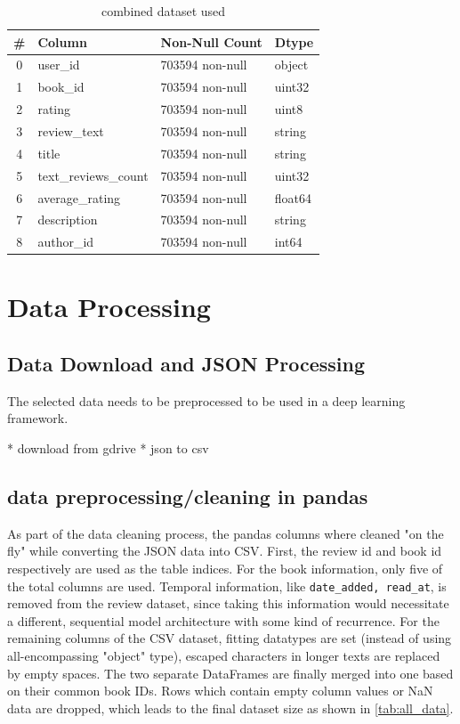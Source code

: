 \documentclass[10pt,final,journal,a4paper,oneside,twocolumn]{IEEEtran}
\begin{document}
\begin{table}[h]
\begin{center}
        \begin{tabular}{clll}
        \toprule
        \# & Column & Non-Null Count & Dtype \\
        \midrule
        0 & user\_id & 703594 non-null & object \\
        1 & book\_id & 703594 non-null & uint32 \\
        2 & rating & 703594 non-null & uint8 \\
        3 & review\_text & 703594 non-null & string \\
        4 & title & 703594 non-null & string \\
        5 & text\_reviews\_count & 703594 non-null & uint32 \\
        6 & average\_rating & 703594 non-null & float64 \\
        7 & description & 703594 non-null & string \\
        8 & author\_id & 703594 non-null & int64 \\
        \bottomrule
        \end{tabular}
        \caption{combined dataset used}
        \label{tab:all_data}
    
\end{center}\end{table}
\section{Data Processing}
\subsection{Data Download and JSON Processing}
The selected data needs to be preprocessed to be used in a deep learning framework.

* download from gdrive
* json to csv

\subsection{data preprocessing/cleaning in pandas}
As part of the data cleaning process, the pandas columns where cleaned "on the fly" while converting the JSON data into CSV. First, the review id and book id respectively are used as the table indices. For the book information, only five of the total  columns are used. Temporal information, like \texttt{date_added, read_at}, is removed from the review dataset, since taking this information would necessitate a different, sequential model architecture with some kind of recurrence.
For the remaining columns of the CSV dataset, fitting datatypes are set (instead of using all-encompassing "object" type), escaped  characters in longer texts are replaced by empty spaces.
The two separate DataFrames are finally merged into one based on their common book IDs. Rows which contain empty column values or NaN data are dropped, which leads to the final dataset size as shown in \autoref{tab:all_data}.
\end{document}

